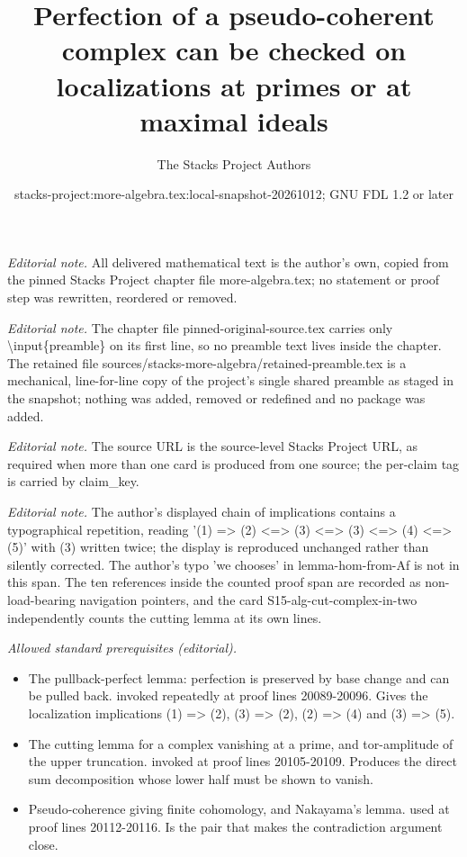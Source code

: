 \documentclass[10pt,a4paper]{amsart}
\title{Perfection of a pseudo-coherent complex can be checked on localizations at primes or at maximal ideals}
\author{The Stacks Project Authors}
\date{stacks-project:more-algebra.tex:local-snapshot-20261012; GNU FDL 1.2 or later}
\theoremstyle{plain}
\theoremstyle{definition}
\theoremstyle{remark}
\numberwithin{equation}{subsection}
\begin{document}
\maketitle
\setcounter{subsection}{1}
\noindent\textit{Editorial note.} All delivered mathematical text is the author's own, copied from the pinned Stacks Project chapter file more-algebra.tex; no statement or proof step was rewritten, reordered or removed.\par\medskip
\noindent\textit{Editorial note.} The chapter file pinned-original-source.tex carries only \textbackslash{}input\{preamble\} on its first line, so no preamble text lives inside the chapter. The retained file sources/stacks-more-algebra/retained-preamble.tex is a mechanical, line-for-line copy of the project's single shared preamble as staged in the snapshot; nothing was added, removed or redefined and no package was added.\par\medskip
\noindent\textit{Editorial note.} The source URL is the source-level Stacks Project URL, as required when more than one card is produced from one source; the per-claim tag is carried by claim\_key.\par\medskip
\noindent\textit{Editorial note.} The author's displayed chain of implications contains a typographical repetition, reading '(1) => (2) <=> (3) <=> (3) <=> (4) <=> (5)' with (3) written twice; the display is reproduced unchanged rather than silently corrected. The author's typo 'we chooses' in lemma-hom-from-Af is not in this span. The ten references inside the counted proof span are recorded as non-load-bearing navigation pointers, and the card S15-alg-cut-complex-in-two independently counts the cutting lemma at its own lines.\par\medskip
\noindent\textit{Allowed standard prerequisites (editorial).}\begin{itemize}
\item The pullback-perfect lemma: perfection is preserved by base change and can be pulled back. invoked repeatedly at proof lines 20089-20096. Gives the localization implications (1) => (2), (3) => (2), (2) => (4) and (3) => (5).
\item The cutting lemma for a complex vanishing at a prime, and tor-amplitude of the upper truncation. invoked at proof lines 20105-20109. Produces the direct sum decomposition whose lower half must be shown to vanish.
\item Pseudo-coherence giving finite cohomology, and Nakayama's lemma. used at proof lines 20112-20116. Is the pair that makes the contradiction argument close.
\end{itemize}\medskip
\end{document}
